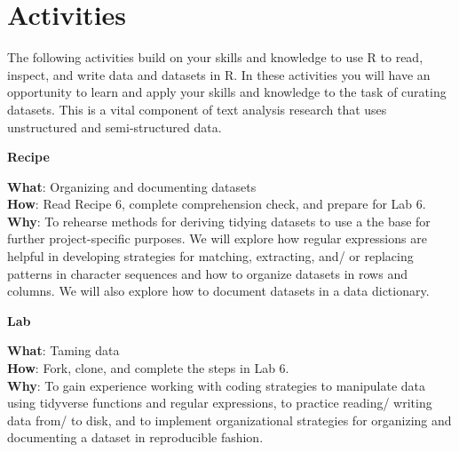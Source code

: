 \documentclass[
  letterpaper,
  krantz1]{latex/krantz-mod}
\theoremstyle{definition}
\theoremstyle{definition}
\theoremstyle{remark}
\begin{document}
\section*{Activities}\label{activities-4}


The following activities build on your skills and knowledge to use R to
read, inspect, and write data and datasets in R. In these activities you
will have an opportunity to learn and apply your skills and knowledge to
the task of curating datasets. This is a vital component of text
analysis research that uses unstructured and semi-structured data.

\begin{tcolorbox}[enhanced jigsaw, leftrule=.75mm, colframe=quarto-callout-color-frame, left=2mm, colback=white, toprule=.15mm, breakable, arc=.35mm, opacityback=0, bottomrule=.15mm, rightrule=.15mm]

\textbf{ Recipe}

\textbf{What}: Organizing and documenting datasets\\
\textbf{How}: Read Recipe 6, complete comprehension check, and prepare
for Lab 6.\\
\textbf{Why}: To rehearse methods for deriving tidying datasets to use a
the base for further project-specific purposes. We will explore how
regular expressions are helpful in developing strategies for matching,
extracting, and/ or replacing patterns in character sequences and how to
organize datasets in rows and columns. We will also explore how to
document datasets in a data dictionary.

\end{tcolorbox}

\begin{tcolorbox}[enhanced jigsaw, leftrule=.75mm, colframe=quarto-callout-color-frame, left=2mm, colback=white, toprule=.15mm, breakable, arc=.35mm, opacityback=0, bottomrule=.15mm, rightrule=.15mm]

\textbf{ Lab}

\textbf{What}: Taming data\\
\textbf{How}: Fork, clone, and complete the steps in Lab 6.\\
\textbf{Why}: To gain experience working with coding strategies to
manipulate data using tidyverse functions and regular expressions, to
practice reading/ writing data from/ to disk, and to implement
organizational strategies for organizing and documenting a dataset in
reproducible fashion.

\end{tcolorbox}
\end{document}
